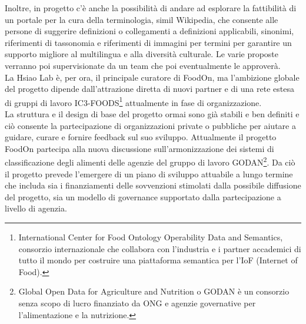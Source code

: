 Inoltre, in progetto c'\`e anche la possibilit\`a di andare ad esplorare la fattibilit\`a di un portale per la cura della terminologia, simil Wikipedia, che consente alle persone di suggerire definizioni o collegamenti a definizioni applicabili, sinonimi, riferimenti di tassonomia e riferimenti di immagini per termini per garantire un supporto migliore al multilingua e alla diversit\`a culturale.
Le varie proposte verranno poi supervisionate da un team che poi eventualmente le approver\`a.\\
La Hsiao Lab \`e, per ora, il principale curatore di FoodOn, ma l'ambizione globale del progetto dipende dall'attrazione diretta di nuovi partner e di una rete estesa di gruppi di lavoro IC3-FOODS\footnote{International Center for Food Ontology Operability Data and Semantics, consorzio internazionale che collabora con l'industria e i partner accademici di tutto il mondo per costruire una piattaforma semantica per l'IoF (Internet of Food).} attualmente in fase di organizzazione.\\
La struttura e il design di base del progetto ormai sono gi\`a stabili e ben definiti e ci\`o consente la partecipazione di organizzazioni private o pubbliche per aiutare a guidare, curare e fornire feedback sul suo sviluppo.
Attualmente il progetto FoodOn partecipa alla nuova discussione sull'armonizzazione dei sistemi di classificazione degli alimenti delle agenzie del gruppo di lavoro GODAN\footnote{Global Open Data for Agriculture and Nutrition o GODAN \`e un consorzio senza scopo di lucro finanziato da ONG e agenzie governative per l'alimentazione e la nutrizione.}.
Da ci\`o il progetto prevede l'emergere di un piano di sviluppo attuabile a lungo termine che includa sia i finanziamenti delle sovvenzioni stimolati dalla possibile diffusione del progetto, sia un modello di governance supportato dalla partecipazione a livello di agenzia.
